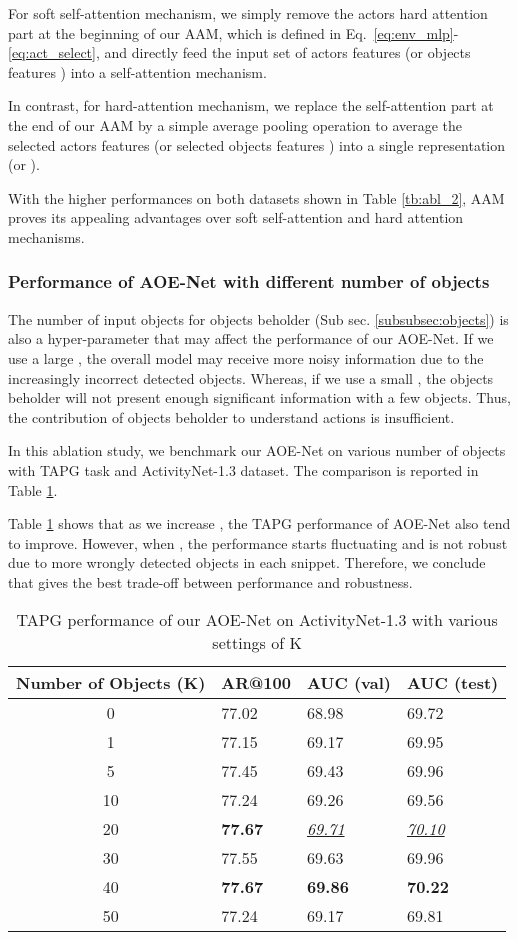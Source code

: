 \documentclass[sn-mathphys]{sn-jnl}
\theoremstyle{thmstyleone}\newtheorem{theorem}{Theorem}\newtheorem{proposition}[theorem]{Proposition}
\theoremstyle{thmstyletwo}\newtheorem{example}{Example}\newtheorem{remark}{Remark}
\theoremstyle{thmstylethree}\newtheorem{definition}{Definition}
\begin{document}
For soft self-attention mechanism, we simply remove the actors hard attention part at the beginning of our AAM, which is defined in Eq.~\ref{eq:env_mlp}-\ref{eq:act_select}, and directly feed the input set of actors features  (or objects features ) into a self-attention mechanism.

In contrast, for hard-attention mechanism, we replace the self-attention part at the end of our AAM by a simple average pooling operation to average the selected actors features  (or selected objects features ) into a single representation  (or ).

With the higher performances on both datasets shown in Table \ref{tb:abl_2}, AAM proves its appealing advantages over soft self-attention and hard attention mechanisms.

\subsubsection{Performance of AOE-Net with different number of objects}
\label{sec:topK}
The number of input objects  for objects beholder (Sub sec. \ref{subsubsec:objects}) is also a hyper-parameter that may affect the performance of our AOE-Net. If we use a large , the overall model may receive more noisy information due to the increasingly incorrect detected objects. Whereas, if we use a small , the objects beholder will not present enough significant information with a few objects. Thus, the contribution of objects beholder to understand actions is insufficient.

In this ablation study, we benchmark our AOE-Net on various number of objects  with TAPG task and ActivityNet-1.3 \cite{caba2015activitynet} dataset. The comparison is reported in Table \ref{tb:num_objects}.

Table \ref{tb:num_objects} shows that as we increase , the TAPG performance of AOE-Net also tend to improve. However, when , the performance starts fluctuating and is not robust due to more wrongly detected objects in each snippet. Therefore, we conclude that  gives the best trade-off between performance and robustness.

\begin{table}[!t]
\centering
\begin{tabular}{c|lll}
Number of Objects (K) & AR@100 & AUC (val) & AUC (test) \\
\hline \hline
0  & 77.02 & 68.98 & 69.72 \\
1  & 77.15 & 69.17 & 69.95 \\
5  & 77.45 & 69.43 & 69.96 \\
10 & 77.24 & 69.26 & 69.56 \\
20 & \textbf{77.67} & \underline{\textit{69.71}} & \underline{\textit{70.10}} \\
30 & 77.55 & 69.63 & 69.96 \\ 40 & \textbf{77.67} & \textbf{69.86} & \textbf{70.22} \\
50 & 77.24 & 69.17 & 69.81 \\
\bottomrule
\end{tabular}
\caption{TAPG performance of our AOE-Net on ActivityNet-1.3 \cite{caba2015activitynet} with various settings of K} \label{tb:num_objects}
\end{table}
\end{document}
